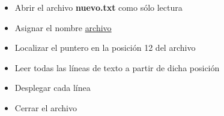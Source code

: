 
\question 
\begin{itemize}
  \item Abrir el archivo \textbf{nuevo.txt} como sólo lectura
  \item Asignar el nombre \underline{archivo}
  \item Localizar el puntero en la posición 12 del archivo
  \item Leer todas las líneas de texto a partir de dicha posición
  \item Desplegar cada línea
  \item Cerrar el archivo
\end{itemize}

